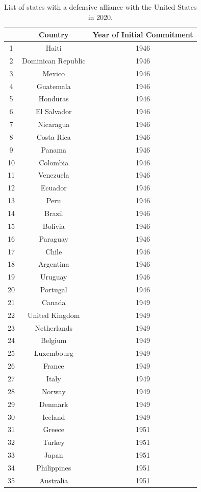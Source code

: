 \documentclass[12pt]{article}
\begin{document}
\begin{longtable}[!htbp]{| c | c | c |} 
\caption{List of states with a defensive alliance with the United States in 2020. \label{tab:us-ally-list}} \\ 
  \hline
 & Country & Year of Initial Commitment \\ 
  \hline
1 & Haiti & 1946 \\ 
  2 & Dominican Republic & 1946 \\ 
  3 & Mexico & 1946 \\ 
  4 & Guatemala & 1946 \\ 
  5 & Honduras & 1946 \\ 
  6 & El Salvador & 1946 \\ 
  7 & Nicaragua & 1946 \\ 
  8 & Costa Rica & 1946 \\ 
  9 & Panama & 1946 \\ 
  10 & Colombia & 1946 \\ 
  11 & Venezuela & 1946 \\ 
  12 & Ecuador & 1946 \\ 
  13 & Peru & 1946 \\ 
  14 & Brazil & 1946 \\ 
  15 & Bolivia & 1946 \\ 
  16 & Paraguay & 1946 \\ 
  17 & Chile & 1946 \\ 
  18 & Argentina & 1946 \\ 
  19 & Uruguay & 1946 \\ 
  20 & Portugal & 1946 \\ 
  21 & Canada & 1949 \\ 
  22 & United Kingdom & 1949 \\ 
  23 & Netherlands & 1949 \\ 
  24 & Belgium & 1949 \\ 
  25 & Luxembourg & 1949 \\ 
  26 & France & 1949 \\ 
  27 & Italy & 1949 \\ 
  28 & Norway & 1949 \\ 
  29 & Denmark & 1949 \\ 
  30 & Iceland & 1949 \\ 
  31 & Greece & 1951 \\ 
  32 & Turkey & 1951 \\ 
  33 & Japan & 1951 \\ 
  34 & Philippines & 1951 \\ 
  35 & Australia & 1951 \\ 

\end{longtable}
\end{document}
